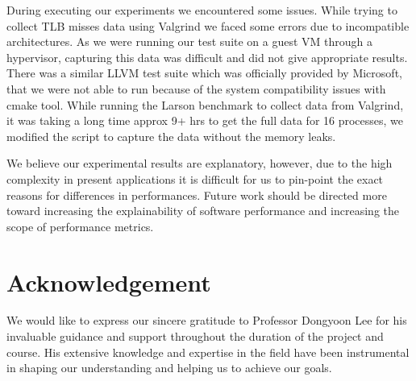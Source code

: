\documentclass[sigplan,screen]{acmart}
\begin{document}
During executing our experiments we encountered some issues. While trying to collect TLB misses data using Valgrind we faced some errors due to incompatible architectures. As we were running our test suite on a guest VM through a hypervisor, capturing this data was difficult and did not give appropriate results. There was a similar LLVM test suite which was officially provided by Microsoft, that we were not able to run because of the system compatibility issues with cmake tool. While running the Larson benchmark to collect data from Valgrind, it was taking a long time approx 9+ hrs to get the full data for 16 processes, we modified the script to capture the data without the memory leaks.

We believe our experimental results are explanatory, however, due to the high complexity in present applications it is difficult for us to pin-point the exact reasons for differences in performances. Future work should be directed more toward increasing the explainability of software performance and increasing the scope of performance metrics.

\section{Acknowledgement}
We would like to express our sincere gratitude to Professor Dongyoon Lee for his invaluable guidance and support throughout the duration of the project and course. His extensive knowledge and expertise in the field have been instrumental in shaping our understanding and helping us to achieve our goals.
  



\end{document}

